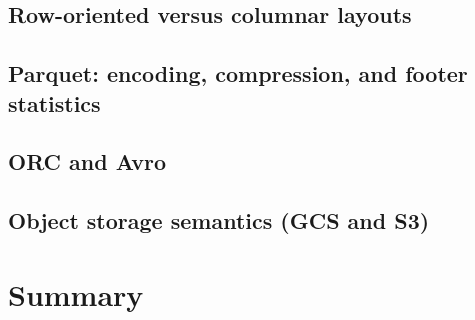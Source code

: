 \subsection{Row-oriented versus columnar layouts}
\tbd

\subsection{Parquet: encoding, compression, and footer statistics}
\tbd

\subsection{ORC and Avro}
\tbd

\subsection{Object storage semantics (GCS and S3)}
\tbd

\section{Summary}
\tbd
